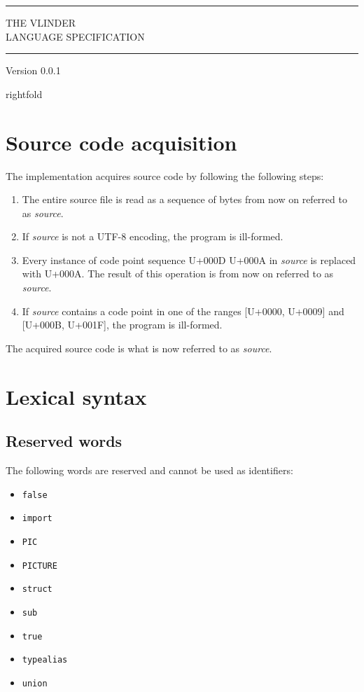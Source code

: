 \documentclass[12pt, oneside]{memoir}
\newcommand{\var}[1]{\emph{#1}}
\newcommand{\cp}[1]{U+#1}
\begin{document}
\begin{titlingpage}
  \begin{vplace}
    \centering
      \rule{\textwidth}{1pt}
      {\LARGE THE VLINDER \\[0.5\baselineskip] LANGUAGE SPECIFICATION}
      \rule{\textwidth}{1pt}
      \vspace{5pt}

      {\large Version 0.0.1}

      \vfill
      rightfold
    \par
  \end{vplace}
\end{titlingpage}

\chapter{Source code acquisition}

The implementation acquires source code by following the following steps:

\begin{enumerate}
  \item The entire source file is read as a sequence of bytes from now on
        referred to as \var{source}.
  \item If \var{source} is not a UTF-8 encoding, the program is ill-formed.
  \item Every instance of code point sequence \cp{000D} \cp{000A} in
        \var{source} is replaced with \cp{000A}. The result of this operation
        is from now on referred to as \var{source}.
  \item If \var{source} contains a code point in one of the ranges
        [\cp{0000}, \cp{0009}] and [\cp{000B}, \cp{001F}], the program is
        ill-formed.
\end{enumerate}

The acquired source code is what is now referred to as \var{source}.

\chapter{Lexical syntax}

\section{Reserved words}

The following words are reserved and cannot be used as identifiers:

\begin{itemize}
  \item \texttt{false}
  \item \texttt{import}
  \item \texttt{PIC}
  \item \texttt{PICTURE}
  \item \texttt{struct}
  \item \texttt{sub}
  \item \texttt{true}
  \item \texttt{typealias}
  \item \texttt{union}
\end{itemize}
\end{document}
